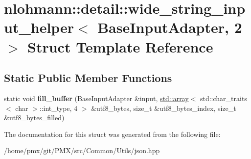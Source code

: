 \hypertarget{structnlohmann_1_1detail_1_1wide__string__input__helper_3_01BaseInputAdapter_00_012_01_4}{}\section{nlohmann\+:\+:detail\+:\+:wide\+\_\+string\+\_\+input\+\_\+helper$<$ Base\+Input\+Adapter, 2 $>$ Struct Template Reference}
\label{structnlohmann_1_1detail_1_1wide__string__input__helper_3_01BaseInputAdapter_00_012_01_4}
\subsection*{Static Public Member Functions}
\begin{DoxyCompactItemize}
\item 
\mbox{\label{structnlohmann_1_1detail_1_1wide__string__input__helper_3_01BaseInputAdapter_00_012_01_4_a293186006f5f8090e337d12571307ced}} 
static void {\bfseries fill\+\_\+buffer} (Base\+Input\+Adapter \&input, \hyperlink{namespacenlohmann_1_1detail_a1ed8fc6239da25abcaf681d30ace4985af1f713c9e000f5d3f280adbd124df4f5}{std\+::array}$<$ std\+::char\+\_\+traits$<$ char $>$\+::int\+\_\+type, 4 $>$ \&utf8\+\_\+bytes, size\+\_\+t \&utf8\+\_\+bytes\+\_\+index, size\+\_\+t \&utf8\+\_\+bytes\+\_\+filled)
\end{DoxyCompactItemize}


The documentation for this struct was generated from the following file\+:\begin{DoxyCompactItemize}
\item 
/home/pmx/git/\+P\+M\+X/src/\+Common/\+Utils/json.\+hpp\end{DoxyCompactItemize}
